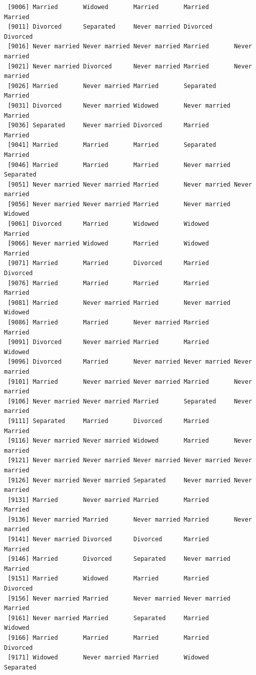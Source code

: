 \documentclass[
  letterpaper,
  DIV=11,
  numbers=noendperiod,
  oneside]{scrartcl}
\begin{document}
\begin{verbatim}
 [9006] Married       Widowed       Married       Married       Married      
 [9011] Divorced      Separated     Never married Divorced      Divorced     
 [9016] Never married Never married Never married Married       Never married
 [9021] Never married Divorced      Never married Married       Never married
 [9026] Married       Never married Married       Separated     Married      
 [9031] Divorced      Never married Widowed       Never married Married      
 [9036] Separated     Never married Divorced      Married       Married      
 [9041] Married       Married       Married       Separated     Married      
 [9046] Married       Married       Married       Never married Separated    
 [9051] Never married Never married Married       Never married Never married
 [9056] Never married Never married Married       Never married Widowed      
 [9061] Divorced      Married       Widowed       Widowed       Married      
 [9066] Never married Widowed       Married       Widowed       Married      
 [9071] Married       Married       Divorced      Married       Divorced     
 [9076] Married       Married       Married       Married       Married      
 [9081] Married       Never married Married       Never married Widowed      
 [9086] Married       Married       Never married Married       Married      
 [9091] Divorced      Never married Married       Married       Widowed      
 [9096] Divorced      Married       Never married Never married Never married
 [9101] Married       Never married Never married Married       Never married
 [9106] Never married Never married Married       Separated     Never married
 [9111] Separated     Married       Divorced      Married       Married      
 [9116] Never married Never married Widowed       Married       Never married
 [9121] Never married Never married Never married Never married Never married
 [9126] Never married Never married Separated     Never married Never married
 [9131] Married       Never married Married       Married       Married      
 [9136] Never married Married       Never married Married       Never married
 [9141] Never married Divorced      Divorced      Married       Married      
 [9146] Married       Divorced      Separated     Never married Married      
 [9151] Married       Widowed       Married       Married       Divorced     
 [9156] Never married Married       Never married Never married Married      
 [9161] Never married Married       Separated     Married       Widowed      
 [9166] Married       Married       Married       Married       Divorced     
 [9171] Widowed       Never married Married       Widowed       Separated    

\end{verbatim}
\end{document}
